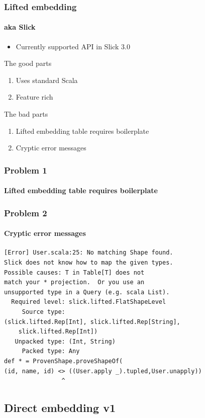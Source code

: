 \documentclass[xcolor=dvipsnames]{beamer}
\theoremstyle{definition}
\begin{document}
\begin{frame}[fragile]
    \frametitle{Lifted embedding}
    \framesubtitle{aka Slick}
    \begin{itemize}
        \item Currently supported API in Slick 3.0
    \end{itemize}
    \begin{block}{The good parts}
        \begin{enumerate}
            \item Uses standard Scala
            \item Feature rich
        \end{enumerate}
    \end{block}
    \begin{block}{The bad parts}
        \begin{enumerate}
            \item Lifted embedding table requires boilerplate
            \item Cryptic error messages
        \end{enumerate}
    \end{block}
\end{frame}

\begin{frame}[fragile]
    \frametitle{Problem 1}
    \framesubtitle{Lifted embedding table requires boilerplate}
    
\end{frame}

\begin{frame}[fragile]
    \frametitle{Problem 2}
    \framesubtitle{Cryptic error messages}
    \begin{verbatim}
[Error] User.scala:25: No matching Shape found.
Slick does not know how to map the given types.
Possible causes: T in Table[T] does not
match your * projection.  Or you use an
unsupported type in a Query (e.g. scala List).
  Required level: slick.lifted.FlatShapeLevel
     Source type:
(slick.lifted.Rep[Int], slick.lifted.Rep[String],
    slick.lifted.Rep[Int])
   Unpacked type: (Int, String)
     Packed type: Any
def * = ProvenShape.proveShapeOf(
(id, name, id) <> ((User.apply _).tupled,User.unapply))
                ^
    \end{verbatim}
\end{frame}


\subsection{Direct embedding v1} %
\label{sub:Directembeddingv1}
\end{document}
